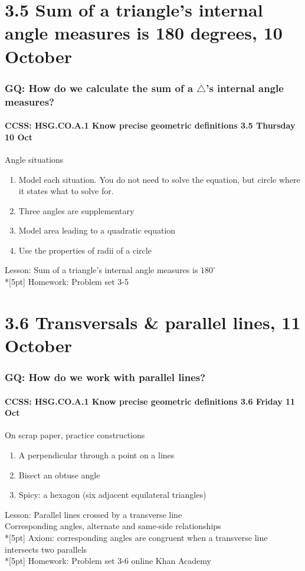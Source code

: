 \documentclass{beamer}
\begin{document}
\section{3.5 Sum of a triangle's internal angle measures is 180 degrees, 10 October}
  \frame
  {
    \frametitle{GQ: How do we calculate the sum of a $\triangle$'s internal angle measures?}
    \framesubtitle{CCSS: HSG.CO.A.1 Know precise geometric definitions \hfill \alert{3.5 Thursday 10 Oct}}

    \begin{block}{Angle situations}
    \begin{enumerate}
      \item Model each situation. You do not need to solve the equation, but circle where it states what to solve for.
      \item Three angles are supplementary
      \item Model area leading to a quadratic equation
      \item Use the properties of radii of a circle
    \end{enumerate}
    \end{block}
    Lesson: Sum of a triangle's internal angle measures is $180^\circ$ \\*[5pt]
    Homework: Problem set 3-5
  }

\section{3.6 Transversals \& parallel lines, 11 October}
  \frame
  {
    \frametitle{GQ: How do we work with parallel lines?}
    \framesubtitle{CCSS: HSG.CO.A.1 Know precise geometric definitions \hfill \alert{3.6 Friday 11 Oct}}

    \begin{block}{On scrap paper, practice constructions}
    \begin{enumerate}
      \item A perpendicular through a point on a lines
      \item Bisect an obtuse angle
      \item Spicy: a hexagon (six adjacent equilateral triangles)
    \end{enumerate}
    \end{block}
    Lesson: Parallel lines crossed by a transverse line \\
    Corresponding angles, alternate and same-side relationships \\*[5pt]
    Axiom: corresponding angles are congruent when a transverse line intersects two parallels\\*[5pt]
    Homework: Problem set 3-6 online Khan Academy
  }
\end{document}
